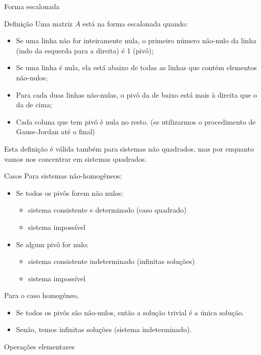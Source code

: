 \documentclass{beamer}
\begin{document}
\begin{darkframes}
\begin{frame}{Forma escalonada}
 \begin{block}{Definição}
   Uma matriz $A$ está na forma escalonada quando:
   {\footnotesize{%
   \begin{itemize}
       \item Se uma linha não for inteiramente nula, o primeiro número não-nulo da linha (indo da esquerda para a direita) é 1 (pivô);
 		\item Se uma linha é nula, ela está abaixo de todas as linhas que contém elementos não-nulos;
 		\item Para cada duas linhas não-nulas, o pivô da de baixo está mais à direita que o da de cima;
 		\item Cada coluna que tem pivô é nula no resto. (se utilizarmos o procedimento de Gauss-Jordan até o final)
   \end{itemize}}}
 \end{block}
Esta definição é válida também para sistemas não quadrados, mas por enquanto vamos nos concentrar em sistemas quadrados. 
\end{frame}

\begin{frame}{Casos}
Para sistemas não-homogêneos:
\begin{itemize}
  \item Se todos os pivôs forem não nulos:
	\begin{itemize} 
		\item sistema consistente e determinado (caso quadrado)
		\item sistema impossível
	\end{itemize}
	\item Se algum pivô for nulo:
	\begin{itemize}
		\item sistema consistente indeterminado (infinitas soluções)
		\item sistema impossível
	\end{itemize}
\end{itemize}
Para o caso homogêneo,
\begin{itemize}
  \item Se todos os pivôs são não-nulos, então a solução trivial é a única solução.
  \item Senão, temos infinitas soluções (sistema indeterminado).
\end{itemize}
\end{frame}

\begin{frame}{Operações elementares}


\end{frame}
\end{darkframes}
\end{document}
